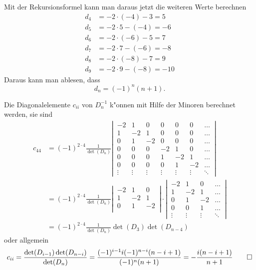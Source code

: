 \begin{loesung}
\begin{teilaufgaben}
Mit der Rekursionsformel kann man daraus jetzt die weiteren Werte berechnen
\begin{align*}
d_4&=-2\cdot(-4) - 3 = 5\\
d_5&=-2\cdot 5 -(-4) = -6\\
d_6&=-2\cdot(-6) - 5 = 7\\
d_7&=-2\cdot 7 -(-6) = -8\\
d_8&=-2\cdot(-8) - 7 = 9\\
d_9&=-2\cdot 9 -(-8) = -10
\end{align*}
Daraus kann man ablesen, dass
\[
d_n=(-1)^n(n+1).
\]
\item
Die Diagonalelemente $c_{ii}$ von $D_n^{-1}$ k"onnen mit Hilfe der Minoren berechnet werden,
sie sind
\begin{align*}
c_{44}
&=
(-1)^{2\cdot 4}\frac{1}{\det(D_n)}
\left|\,
\begin{matrix}
-2& 1& 0& 0& 0& 0&\dots\\
 1&-2& 1& 0& 0& 0&\dots\\
 0& 1&-2& 0& 0& 0&\dots\\
 0& 0& 0&-2& 1& 0&\dots\\
 0& 0& 0& 1&-2& 1&\dots\\
 0& 0& 0& 0& 1&-2&\dots\\
\vdots&\vdots&\vdots&\vdots&\vdots&\vdots&\ddots
\end{matrix}
\,\right|
\\
&=
(-1)^{2\cdot 4}\frac{1}{\det(D_n)}
\left|\,
\begin{matrix}
-2& 1& 0\\
 1&-2& 1\\
 0& 1&-2\\
\end{matrix}
\,\right|
\cdot
\left|\,
\begin{matrix}
-2& 1& 0&\dots\\
 1&-2& 1&\dots\\
 0& 1&-2&\dots\\
 0& 0& 1&\dots\\
\vdots&\vdots&\vdots&\ddots
\end{matrix}
\,\right|
\\
&=
(-1)^{2\cdot 4}\frac{1}{\det(D_n)}\det(D_3)\det(D_{n-4})
\end{align*}
oder allgemein
\[
c_{ii}
=\frac{\det(D_{i-1})\det(D_{n-i})}{\det(D_n)}
=\frac{(-1)^{i-1}i(-1)^{n-i}(n-i+1)}{(-1)^n(n+1)}
=-\frac{i(n-i+1)}{n+1}
\qedhere
\]
\end{teilaufgaben}
\end{loesung}

